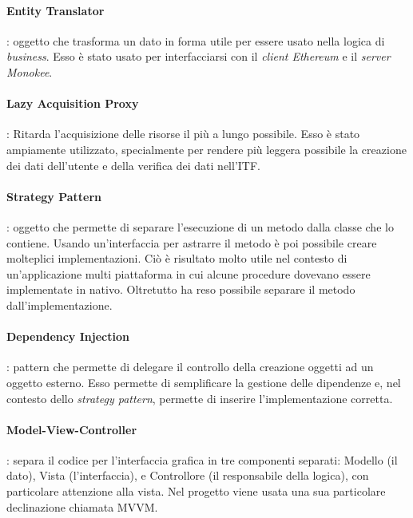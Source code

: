 \paragraph{Entity Translator}: oggetto che trasforma un dato in forma utile per essere usato nella logica di \emph{business}. Esso è stato usato per interfacciarsi con il \emph{client Ethereum} e il \emph{server Monokee}.

\paragraph{Lazy Acquisition Proxy}: Ritarda l’acquisizione delle risorse il più a lungo possibile. Esso è stato ampiamente utilizzato, specialmente per rendere più leggera possibile la creazione dei dati dell’utente e della verifica dei dati nell’ITF.

\paragraph{Strategy Pattern}: oggetto che permette di separare l’esecuzione di un metodo dalla classe che lo contiene. Usando un’interfaccia per astrarre il metodo è poi possibile creare molteplici implementazioni. Ciò è risultato molto utile nel contesto di un’applicazione multi piattaforma in cui alcune procedure dovevano essere implementate in nativo. Oltretutto ha reso possibile separare il metodo dall’implementazione.

\paragraph{Dependency Injection}: pattern che permette di delegare il controllo della creazione oggetti ad un oggetto esterno. Esso permette di semplificare la gestione delle dipendenze e, nel contesto dello \emph{strategy pattern}, permette di inserire l’implementazione corretta.

\paragraph{Model-View-Controller}: separa il codice per l’interfaccia grafica in tre componenti separati: Modello (il dato), Vista (l’interfaccia), e Controllore (il responsabile della logica), con particolare attenzione alla vista. Nel progetto viene usata una sua particolare declinazione chiamata MVVM. 



